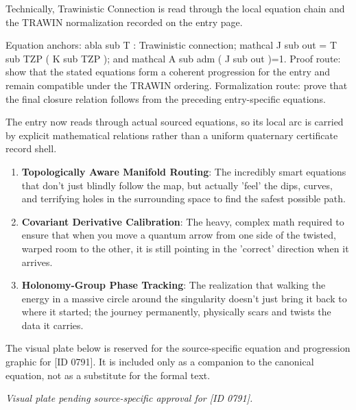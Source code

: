 Technically, Trawinistic Connection is read through the local equation chain and the TRAWIN normalization recorded on the entry page.

Equation anchors: abla sub T : Trawinistic connection; mathcal J sub out = T sub TZP ( K sub TZP ); and mathcal A sub adm ( J sub out )=1. Proof route: show that the stated equations form a coherent progression for the entry and remain compatible under the TRAWIN ordering. Formalization route: prove that the final closure relation follows from the preceding entry-specific equations.

The entry now reads through actual sourced equations, so its local arc is carried by explicit mathematical relations rather than a uniform quaternary certificate record shell.
\endgroup

\begin{enumerate}[leftmargin=1.6em,itemsep=6pt,topsep=4pt]
\item \textbf{Topologically Aware Manifold Routing}: The incredibly smart equations that don't just blindly follow the map, but actually 'feel' the dips, curves, and terrifying holes in the surrounding space to find the safest possible path.
\item \textbf{Covariant Derivative Calibration}: The heavy, complex math required to ensure that when you move a quantum arrow from one side of the twisted, warped room to the other, it is still pointing in the 'correct' direction when it arrives.
\item \textbf{Holonomy-Group Phase Tracking}: The realization that walking the energy in a massive circle around the singularity doesn't just bring it back to where it started; the journey permanently, physically scars and twists the data it carries.
\end{enumerate}

\begingroup\footnotesize\sloppy
The visual plate below is reserved for the source-specific equation and progression graphic for [ID 0791]. It is included only as a companion to the canonical equation, not as a substitute for the formal text.
\par\endgroup
\begingroup\footnotesize\itshape
Visual plate pending source-specific approval for [ID 0791].
\par\endgroup

